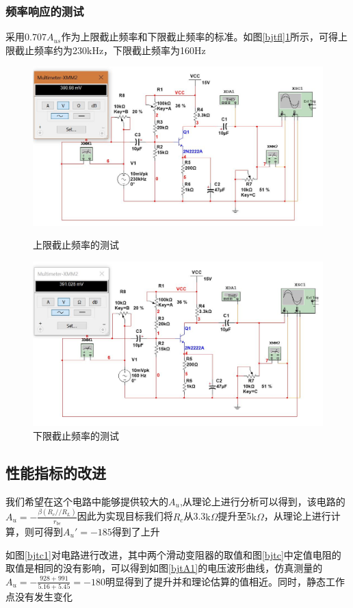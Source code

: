 \documentclass[UTF8,a4paper]{ctexart}
\begin{document}
\subsubsection{频率响应的测试}
采用$0.707A_{us}$作为上限截止频率和下限截止频率的标准。如图\ref{bjtfl}\ref{bjtfh}所示，可得上限截止频率约为230kHz，下限截止频率为160Hz
\begin{figure}
\centering
\includegraphics[width=\textwidth]{1-2fh.jpg}
\caption{上限截止频率的测试}
\label{bjtfl}
\includegraphics[width=\textwidth]{1-2fl.jpg}
\caption{下限截止频率的测试}
\label{bjtfh}
\end{figure}
\subsection{性能指标的改进}
我们希望在这个电路中能够提供较大的$A_u$,从理论上进行分析可以得到，该电路的$A_u=-\frac{\beta(R_c//R_L)}{r_{be}}$因此为实现目标我们将$R_c$从3.3$\mathrm{k}\Omega$提升至5$\mathrm{k}\Omega$，从理论上进行计算，则可得到$A_u'=-185$得到了上升

如图\ref{bjtc1}对电路进行改进，其中两个滑动变阻器的取值和图\ref{bjtc}中定值电阻的取值是相同的没有影响，可以得到如图\ref{bjtA1}的电压波形曲线，仿真测量的$A_u=-\frac{928+991}{5.16+5.45}=-180$明显得到了提升并和理论估算的值相近。同时，静态工作点没有发生变化
\end{document}
